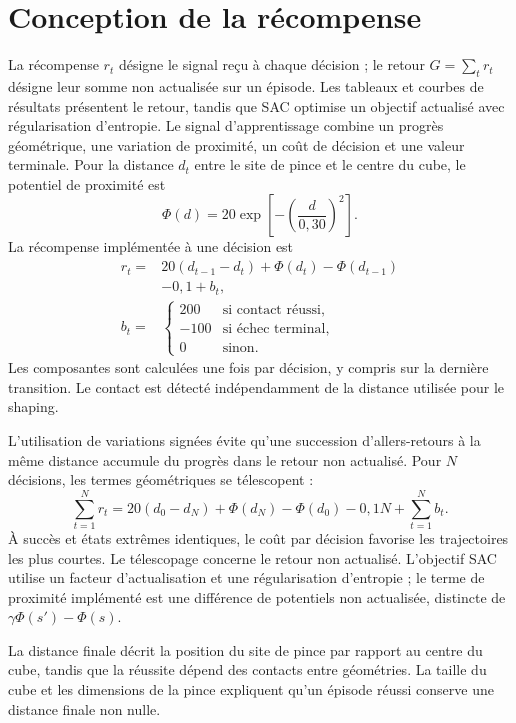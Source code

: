 \documentclass[conference,a4paper]{IEEEtran}
\begin{document}
\section{Conception de la récompense}
La récompense $r_t$ désigne le signal reçu à chaque décision ; le retour $G=\sum_t r_t$ désigne leur somme non actualisée sur un épisode. Les tableaux et courbes de résultats présentent le retour, tandis que SAC optimise un objectif actualisé avec régularisation d'entropie. Le signal d'apprentissage combine un progrès géométrique, une variation de proximité, un coût de décision et une valeur terminale. Pour la distance $d_t$ entre le site de pince et le centre du cube, le potentiel de proximité est
\begin{equation}
\Phi(d)=20\exp\left[-\left(\frac{d}{0{,}30}\right)^2\right].
\end{equation}
La récompense implémentée à une décision est
\begin{align}
r_t={}&20(d_{t-1}-d_t)+\Phi(d_t)-\Phi(d_{t-1})\nonumber\\
&-0{,}1+b_t,\label{eq:reward}\\
b_t={}&\begin{cases}
200 & \text{si contact réussi},\\
-100 & \text{si échec terminal},\\
0 & \text{sinon}.
\end{cases}\nonumber
\end{align}
Les composantes sont calculées une fois par décision, y compris sur la dernière transition. Le contact est détecté indépendamment de la distance utilisée pour le shaping.

L'utilisation de variations signées évite qu'une succession d'allers-retours à la même distance accumule du progrès dans le retour non actualisé. Pour $N$ décisions, les termes géométriques se télescopent :
\begin{equation}
\sum_{t=1}^{N}r_t=20(d_0-d_N)+\Phi(d_N)-\Phi(d_0)
-0{,}1N+\sum_{t=1}^{N}b_t.
\end{equation}
À succès et états extrêmes identiques, le coût par décision favorise les trajectoires les plus courtes. Le télescopage concerne le retour non actualisé. L'objectif SAC utilise un facteur d'actualisation et une régularisation d'entropie ; le terme de proximité implémenté est une différence de potentiels non actualisée, distincte de $\gamma\Phi(s')-\Phi(s)$.

La distance finale décrit la position du site de pince par rapport au centre du cube, tandis que la réussite dépend des contacts entre géométries. La taille du cube et les dimensions de la pince expliquent qu'un épisode réussi conserve une distance finale non nulle.
\end{document}
